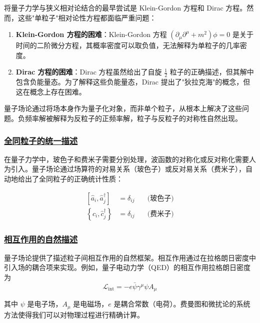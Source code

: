 将量子力学与狭义相对论结合的最早尝试是 Klein-Gordon 方程和 Dirac 方程。然而，这些"单粒子"相对论性方程都面临严重问题：

\begin{enumerate}
    \item \textbf{Klein-Gordon 方程的困难}：Klein-Gordon 方程 $\left(\partial_\mu\partial^\mu + m^2\right)\phi = 0$ 是关于时间的二阶微分方程，其概率密度可以取负值，无法解释为单粒子的几率密度。
    
    \item \textbf{Dirac 方程的困难}：Dirac 方程虽然给出了自旋 $\frac{1}{2}$ 粒子的正确描述，但其解中包含负能量态。为了解释这些负能量态，Dirac 提出了"狄拉克海"的概念，但这在概念上存在困难。
\end{enumerate}

量子场论通过将场本身作为量子化对象，而非单个粒子，从根本上解决了这些问题。负频率解被解释为反粒子的正频率解，粒子与反粒子的对称性自然出现。

\subsubsection{\protect\hyperlink{:}{全同粒子的统一描述}}

在量子力学中，玻色子和费米子需要分别处理，波函数的对称化或反对称化需要人为引入。量子场论通过场算符的对易关系（玻色子）或反对易关系（费米子），自动地给出了全同粒子的正确统计性质：

\begin{align*}
    \left[\hat{a}_i, \hat{a}_j^\dagger\right] &= \delta_{ij} \quad &\text{(玻色子)} \\
    \left\{\hat{c}_i, \hat{c}_j^\dagger\right\} &= \delta_{ij} \quad &\text{(费米子)}
\end{align*}

\subsubsection{\protect\hyperlink{:}{相互作用的自然描述}}

量子场论提供了描述粒子间相互作用的自然框架。相互作用通过在拉格朗日密度中引入场的耦合项来实现。例如，量子电动力学（QED）的相互作用拉格朗日密度为
\begin{equation*}
    \mathcal{L}_{\text{int}} = -e\bar{\psi}\gamma^\mu\psi A_\mu
\end{equation*}

其中 $\psi$ 是电子场，$A_\mu$ 是电磁场，$e$ 是耦合常数（电荷）。费曼图和微扰论的系统方法使得我们可以对物理过程进行精确计算。

